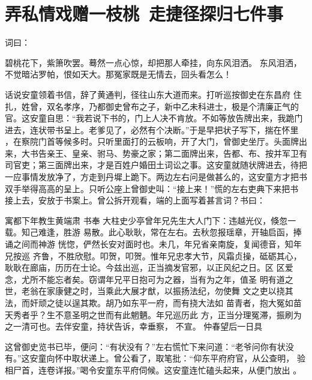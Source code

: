 \chapter{弄私情戏赠一枝桃~走捷径探归七件事}

词曰：

碧桃花下，紫箫吹罢。蓦然一点心惊，却把那人牵挂，向东风泪洒。
东风泪洒，不觉暗沾罗帕，恨如天大。那冤家既是无情去，回头看怎么！

话说安童领着书信，辞了黄通判，径往山东大道而来。打听巡按御史在东昌府
住扎，姓曾，双名孝序，乃都御史曾布之子，新中乙未科进士，极是个清廉正气的
官。这安童自思：“我若说下书的，门上人决不肯放。不如等放告牌出来，我跪门
进去，连状带书呈上。老爹见了，必然有个决断。”于是早把状子写下，揣在怀里
，在察院门首等候多时。只听里面打的云板响，开了大门，曾御史坐厅。头面牌出
来，大书告亲王、皇亲、驸马、势豪之家；第二面牌出来，告都、布、按并军卫有
司官吏；第三面牌出来，才是百姓户婚田土词讼之事。这安童就随状牌进去，待把
一应事情发放净了，方走到丹墀上跪下。两边左右问是做甚么的，这安童方才把书
双手举得高高的呈上。只听公座上曾御史叫：“接上来！”慌的左右吏典下来把书
接上去，安放于书案上。曾公拆开观看，端的上面写着甚言词？书曰：

寓都下年教生黄端肃 书奉
大柱史少亭曾年兄先生大人门下：违越光仪，倏忽一载。知己难逢，胜游
易散。此心耿耿，常在左右。去秋忽报瑶章，开轴启函，捧诵之间而神游
恍惚，俨然长安对面时也。未几，年兄省亲南旋，复闻德音，知年兄按巡
齐鲁，不胜欣慰。叩贺，叩贺。惟年兄忠孝大节，风霜贞操，砥砺其心，
耿耿在廊庙，历历在士论。今兹出巡，正当摘发官邪，以正风纪之日。区
区爱念，尤所不能忘者矣。窃谓年兄平日抱可为之器，当有为之年，值圣
明有道之世，老翁在家康健之时，当乘此大展才猷，以振扬法纪，勿使舞
文之吏以挠其法，而奸顽之徒以逞其欺。胡乃如东平一府，而有挠大法如
苗青者，抱大冤如苗天秀者乎？生不意圣明之世而有此魍魉。年兄巡历此
方，正当分理冤滞，振刷为之一清可也。去伴安童，持状告诉，幸垂察，
不宣。
仲春望后一日具

这曾御史览书已毕，便问：“有状没有？”左右慌忙下来问道：“老爷问你有状没
有。”这安童向怀中取状递上。曾公看了，取笔批：“仰东平府府官，从公查明，
验相尸首，连卷详报。”喝令安童东平府伺候。这安童连忙磕头起来，从便门放出
。

